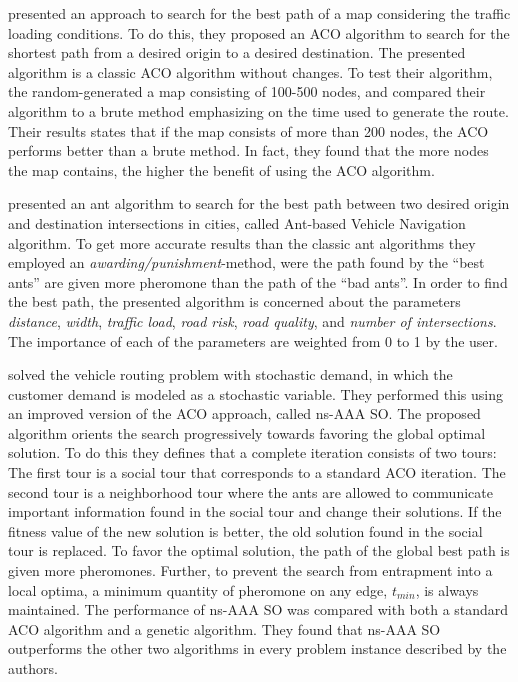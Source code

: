 \citet{hsiao04} presented an approach to search for the best path of a map considering the traffic loading conditions. To do this, they proposed an ACO algorithm to search for the shortest path from a desired origin to a desired destination. The presented algorithm is a classic ACO algorithm without changes. To test their algorithm, the random-generated a map consisting of 100-500 nodes, and compared their algorithm to a brute method emphasizing on the time used to generate the route. Their results states that if the map consists of more than 200 nodes, the ACO performs better than a brute method. In fact, they found that the more nodes the map contains, the higher the benefit of using the ACO algorithm. 

\citet{salehi-nezhad07} presented an ant algorithm to search for the best path between two desired origin and destination intersections in cities, called Ant-based Vehicle Navigation algorithm. To get more accurate results than the classic ant algorithms they employed an \textit{awarding/punishment}-method, were the path found by the ``best ants'' are given more pheromone than the path of the ``bad ants''. In order to find the best path, the presented algorithm is concerned about the parameters \textit{distance}, \textit{width}, \textit{traffic load}, \textit{road risk}, \textit{road quality}, and \textit{number of intersections}. The importance of each of the parameters are weighted from 0 to 1 by the user. 

\citet{tripathi09} solved the vehicle routing problem with stochastic demand, in which the customer demand is modeled as a stochastic variable. They performed this using an improved version of the ACO approach, called ns-AAA SO. The proposed algorithm orients the search progressively towards favoring the global optimal solution. To do this they defines that a complete iteration consists of two tours: The first tour is a social tour that corresponds to a standard ACO iteration. The second tour is a neighborhood tour where the ants are allowed to communicate important information found in the social tour and change their solutions. If the fitness value of the new solution is better, the old solution found in the social tour is replaced. To favor the optimal solution, the path of the global best path is given more pheromones. Further, to prevent the search from entrapment into a local optima, a minimum quantity of pheromone on any edge, $t_{min}$, is always maintained. The performance of ns-AAA SO was compared with both a standard ACO algorithm and a genetic algorithm. They found that ns-AAA SO outperforms the other two algorithms in every problem instance described by the authors.

